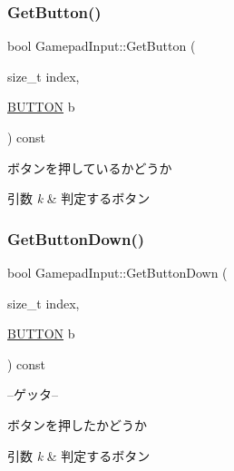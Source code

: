 \subsubsection{\texorpdfstring{Get\+Button()}{GetButton()}}
{\footnotesize\ttfamily bool Gamepad\+Input\+::\+Get\+Button (\begin{DoxyParamCaption}\item[{size\+\_\+t}]{index,  }\item[{\mbox{\hyperlink{gamepad__input_8h_a739845b0076428add52ca3cec492e705}{B\+U\+T\+T\+ON}}}]{b }\end{DoxyParamCaption}) const\hspace{0.3cm}{\ttfamily [inline]}}



ボタンを押しているかどうか 


\begin{DoxyParams}{引数}
{\em k} & 判定するボタン \\
\hline
\end{DoxyParams}
\mbox{\label{class_gamepad_input_a29a71d0503e038e55ffe282e2c768b05}} 
\subsubsection{\texorpdfstring{Get\+Button\+Down()}{GetButtonDown()}}
{\footnotesize\ttfamily bool Gamepad\+Input\+::\+Get\+Button\+Down (\begin{DoxyParamCaption}\item[{size\+\_\+t}]{index,  }\item[{\mbox{\hyperlink{gamepad__input_8h_a739845b0076428add52ca3cec492e705}{B\+U\+T\+T\+ON}}}]{b }\end{DoxyParamCaption}) const\hspace{0.3cm}{\ttfamily [inline]}}



--ゲッタ-- 

ボタンを押したかどうか 
\begin{DoxyParams}{引数}
{\em k} & 判定するボタン \\
\hline
\end{DoxyParams}
\mbox{\label{class_gamepad_input_a5b76a114b8d3d03abbd2bcd91562109a}} 
